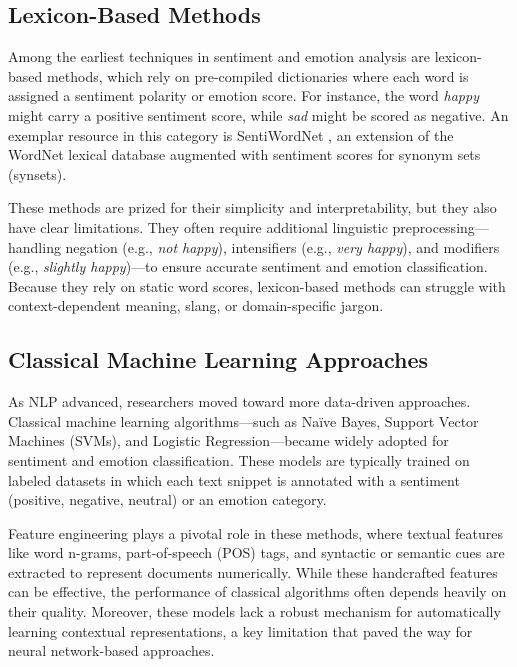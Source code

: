 \subsection*{Lexicon-Based Methods}
Among the earliest techniques in sentiment and emotion analysis are lexicon-based methods, which rely on pre-compiled dictionaries where each word is assigned a sentiment polarity or emotion score. For instance, the word \textit{happy} might carry a positive sentiment score, while \textit{sad} might be scored as negative. An exemplar resource in this category is SentiWordNet \cite{baccianella-etal-2010-sentiwordnet}, an extension of the WordNet lexical database augmented with sentiment scores for synonym sets (synsets).
\newline

These methods are prized for their simplicity and interpretability, but they also have clear limitations. They often require additional linguistic preprocessing—handling negation (e.g., \textit{not happy}), intensifiers (e.g., \textit{very happy}), and modifiers (e.g., \textit{slightly happy})—to ensure accurate sentiment and emotion classification. Because they rely on static word scores, lexicon-based methods can struggle with context-dependent meaning, slang, or domain-specific jargon.

\subsection*{Classical Machine Learning Approaches}
As NLP advanced, researchers moved toward more data-driven approaches. Classical machine learning algorithms—such as Naïve Bayes, Support Vector Machines (SVMs), and Logistic Regression—became widely adopted for sentiment and emotion classification. These models are typically trained on labeled datasets in which each text snippet is annotated with a sentiment (positive, negative, neutral) or an emotion category.
\newline

Feature engineering plays a pivotal role in these methods, where textual features like word n-grams, part-of-speech (POS) tags, and syntactic or semantic cues are extracted to represent documents numerically. While these handcrafted features can be effective, the performance of classical algorithms often depends heavily on their quality. Moreover, these models lack a robust mechanism for automatically learning contextual representations, a key limitation that paved the way for neural network-based approaches.

